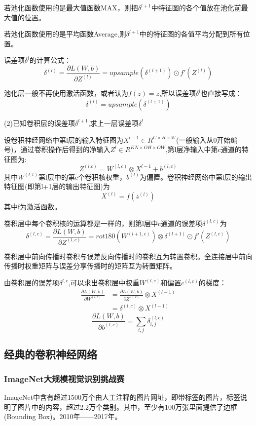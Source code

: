 \documentclass[openbib]{article}
\begin{document}
若池化函数使用的是最大值函数MAX，则把$\delta^{l+1}$中特征图的各个值放在池化前最大值的位置。

若池化函数使用的是平均函数Average,则$\delta^{l+1}$中的特征图的各值平均分配到所有位置。

误差项$\delta^l$的计算公式：
$$\delta^{(l)}=\frac{\partial L(W,b)}{\partial Z^{(l)}}=upsample(\delta^{(l+1)})\odot f'(Z^{(l)})$$

池化层一般不再使用激活函数，或者认为$f(z)=z$,所以误差项$\delta^l$也直接写成：
$$\delta^{(l)}=upsample(\delta^{(l+1)})$$

(2)已知卷积层的误差项$\delta^{l+1}$,求上一层误差项$\delta^l$

设卷积神经网络中第l层的输入特征图为$X^{l-1}\in R^{C\times H\times W}$(一般输入从0开始编号)，通过卷积操作后得到的净输入$Z^l\in R^{KN\times OH\times OW}$,第l层净输入中第c通道的特征图为:$$Z^{(l.c)}=W^{(l,c)}\otimes X^{l-1} + b^{(l,c)}$$
其中$W^{(l,t)}$第l层中的第c个卷积核权重，$b^{(l)}$为偏置。卷积神经网络中第l层的输出特征图(即第l+1层的输出特征图)为
$$X^{(l)}=f(z^{(l)})$$
其中f为激活函数。

卷积层中每个卷积核的运算都是一样的，则第l层中c通道的误差项$\delta^{(l,c)}$为
$$\delta^{(l,c)}=\frac{\partial L(W,b)}{\partial Z^{(l,c)}}=rot180(W^{(l+1,c)})\otimes \delta^{(l+1)}\odot f'(Z^{(l,c)})$$

卷积层中前向传播时卷积与误差反向传播时的卷积互为转置卷积。全连接层中前向传播时权重矩阵与误差分享传播时的矩阵互为转置矩阵。

由卷积层的误差项$\delta^{l,c}$,可以求出卷积层中权重$W^{(l,c)}$和偏置$c^{(l,c)}$的梯度：
\begin{equation*}
	\begin{aligned}
		\frac{\partial L(W,b)}{\partial W^{(l,c)}} &=\frac{\partial L(W,b)}{\partial Z^{(l,c)}}\otimes X^{(l-1)} \\
		&=\delta^{(l,c)}\otimes X^{(l-1)}
	\end{aligned}
\end{equation*}
$$\frac{\partial L(W,b)}{\partial b^{(l,c)}}=\sum_{i,j}\delta_{i,j}^{(l,c)}$$

\subsection{经典的卷积神经网络}

\subsubsection{ImageNet大规模视觉识别挑战赛}
ImageNet中含有超过1500万个由人工注释的图片网址，即带标签的图片，标签说明了图片中的内容，超过2.2万个类别。其中，至少有100万张里面提供了边框(Bounding Box)。2010年——2017年。
\end{document}
